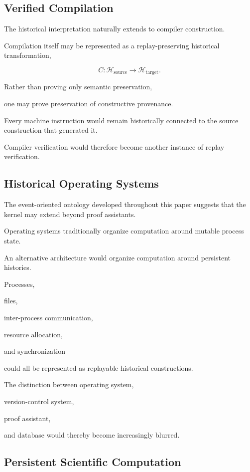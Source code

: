 \documentclass[12pt,oneside]{article}
\theoremstyle{definition}
\theoremstyle{remark}
\begin{document}
\subsection{Verified Compilation}

The historical interpretation naturally extends to compiler construction.

Compilation itself may be represented as a replay-preserving historical
transformation,

\[
C
:
\mathcal H_{\mathrm{source}}
\rightarrow
\mathcal H_{\mathrm{target}}.
\]

Rather than proving only semantic preservation,

one may prove preservation of constructive provenance.

Every machine instruction would remain historically connected to the source
construction that generated it.

Compiler verification would therefore become another instance of replay
verification.

\subsection{Historical Operating Systems}

The event-oriented ontology developed throughout this paper suggests that the
kernel may extend beyond proof assistants.

Operating systems traditionally organize computation around mutable process
state.

An alternative architecture would organize computation around persistent
histories.

Processes,

files,

inter-process communication,

resource allocation,

and synchronization

could all be represented as replayable historical constructions.

The distinction between operating system,

version-control system,

proof assistant,

and database would thereby become increasingly blurred.

\subsection{Persistent Scientific Computation}
\end{document}
